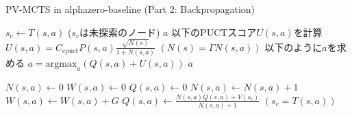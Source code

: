 \begin{algorithm}
    \caption{PV-MCTS in alphazero-baseline (Part 2: Backpropagation)}
    \begin{algorithmic}[1]
                \State $s_c \gets T(s, a)$ ($s_c$は未探索のノード)
                \State {}
                \State \Return $a$
            \Else
                \State 以下のPUCTスコア$U(s, a)$を計算
                \State $U(s, a)= C_{\textrm{cpuct}}P(s, a)\frac{\sqrt{N(s)}}{1+N(s, a)}$
                \State $(N(s)=\Gamma N(s, a))$
                \State 以下のように$a$を求める
                \State $a = {\textrm{argmax}}_a (Q(s, a)+U(s, a))$
                \State \Return $a$
                
            \EndIf
        \EndFunction
                \State $N(s, a) \gets 0$
                \State $W(s, a) \gets 0$
                \State $Q(s, a) \gets 0$
            \EndFor
        \EndFunction
                \State $N(s, a) \gets N(s, a)+1$
                \State $W(s, a) \gets W(s, a)+G$
                \State $Q(s, a) \gets \frac{N(s, a)Q(s, a)+V(s_c)}{N(s, a)+1}$
				\State $(s_c = T(s, a))$
            \EndFor
        \EndFunction
    \end{algorithmic}
\end{algorithm}